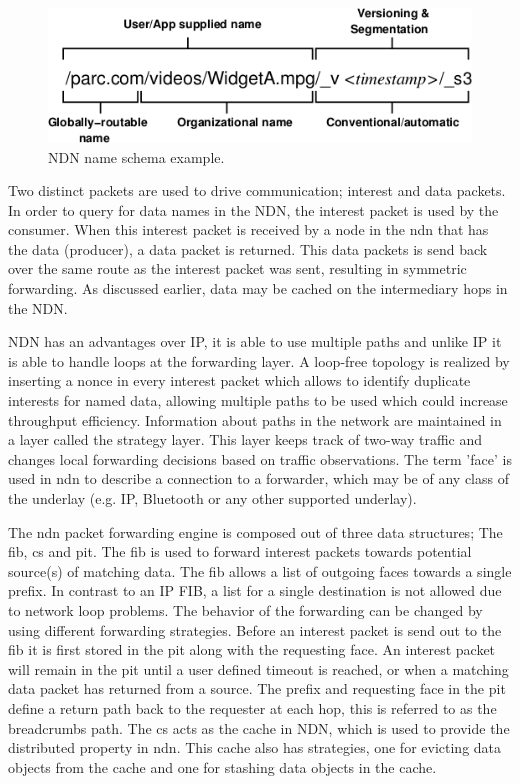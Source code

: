 \begin{figure}[H]
\centering
\includegraphics[width=\columnwidth/2]{Images/ndn_name.png}
\caption{NDN name schema example.}
\label{fig:ndn_name}
\end{figure}

Two distinct packets are used to drive communication; interest and data packets. In order to query for data names in the NDN, the interest packet is used by the consumer. When this interest packet is received by a node in the \gls{ndn} that has the data (producer), a data packet is returned. This data packets is send back over the same route as the interest packet was sent, resulting in symmetric forwarding. As discussed earlier, data may be cached on the intermediary hops in the NDN.

NDN has an advantages over IP, it is able to use multiple paths and unlike IP it is able to handle loops at the forwarding layer. A loop-free topology is realized by inserting a nonce in every interest packet which allows to identify duplicate interests for named data, allowing multiple paths to be used which could increase throughput efficiency. Information about paths in the network are maintained in a layer called the strategy layer. This layer keeps track of two-way traffic and changes local forwarding decisions based on traffic observations. The term 'face' is used in \gls{ndn} to describe a connection to a forwarder, which may be of any class of the underlay (e.g. IP, Bluetooth or any other supported underlay).

The \gls{ndn} packet forwarding engine is composed out of three data structures; The \gls{fib}, \gls{cs} and \gls{pit}. The \gls{fib} is used to forward interest packets towards potential source(s) of matching data. The \gls{fib} allows a list of outgoing faces towards a single prefix. In contrast to an IP FIB, a list for a single destination is not allowed due to network loop problems. The behavior of the forwarding can be changed by using different forwarding strategies. Before an interest packet is send out to the \gls{fib} it is first stored in the \gls{pit} along with the requesting face. An interest packet will remain in the \gls{pit} until a user defined timeout is reached, or when a matching data packet has returned from a source. The prefix and requesting face in the \gls{pit} define a return path back to the requester at each hop, this is referred to as the breadcrumbs path. The \gls{cs} acts as the cache in NDN, which is used to provide the distributed property in \gls{ndn}. This cache also has strategies, one for evicting data objects from the cache and one for stashing data objects in the cache.

